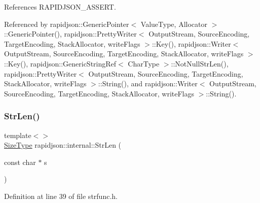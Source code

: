 References R\+A\+P\+I\+D\+J\+S\+O\+N\+\_\+\+A\+S\+S\+E\+RT.



Referenced by rapidjson\+::\+Generic\+Pointer$<$ Value\+Type, Allocator $>$\+::\+Generic\+Pointer(), rapidjson\+::\+Pretty\+Writer$<$ Output\+Stream, Source\+Encoding, Target\+Encoding, Stack\+Allocator, write\+Flags $>$\+::\+Key(), rapidjson\+::\+Writer$<$ Output\+Stream, Source\+Encoding, Target\+Encoding, Stack\+Allocator, write\+Flags $>$\+::\+Key(), rapidjson\+::\+Generic\+String\+Ref$<$ Char\+Type $>$\+::\+Not\+Null\+Str\+Len(), rapidjson\+::\+Pretty\+Writer$<$ Output\+Stream, Source\+Encoding, Target\+Encoding, Stack\+Allocator, write\+Flags $>$\+::\+String(), and rapidjson\+::\+Writer$<$ Output\+Stream, Source\+Encoding, Target\+Encoding, Stack\+Allocator, write\+Flags $>$\+::\+String().

\mbox{\label{namespacerapidjson_1_1internal_a48318b28376546f0bcf0c26e82f45cae}} 
\subsubsection{\texorpdfstring{StrLen()}{StrLen()}\hspace{0.1cm}{\footnotesize\ttfamily [2/3]}}
{\footnotesize\ttfamily template$<$$>$ \\
\mbox{\hyperlink{namespacerapidjson_a44eb33eaa523e36d466b1ced64b85c84}{Size\+Type}} rapidjson\+::internal\+::\+Str\+Len (\begin{DoxyParamCaption}\item[{const char $\ast$}]{s }\end{DoxyParamCaption})}



Definition at line 39 of file strfunc.\+h.


\begin{DoxyCode}{0}

\end{DoxyCode}
\mbox{\label{namespacerapidjson_1_1internal_ae74a003a7f30195697381e82a63111fb}} 
